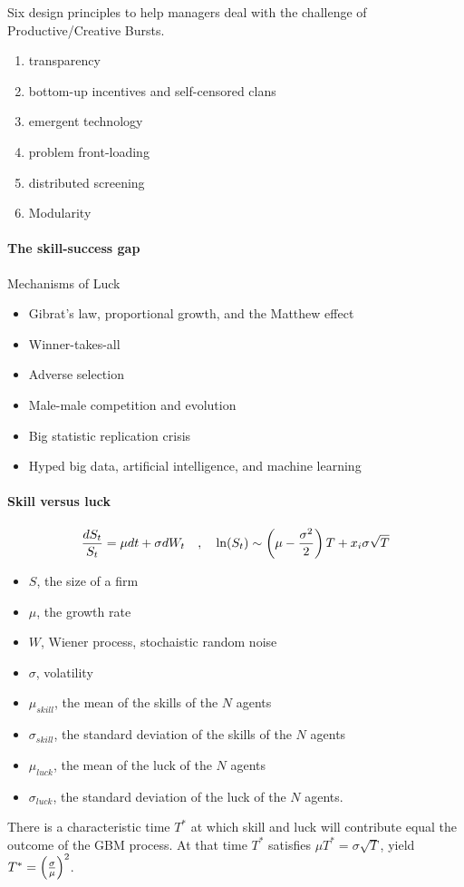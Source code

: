 Six design principles to help managers deal with the challenge of
Productive/Creative Bursts.
\begin{enumerate}[1)]
    \item transparency
    \item bottom-up incentives and self-censored clans
    \item emergent technology
    \item problem front-loading
    \item distributed screening
    \item Modularity
\end{enumerate}

\paragraph{The skill-success gap}

Mechanisms of Luck
\begin{itemize}
    \item Gibrat's law, proportional growth, and the Matthew effect
    \item Winner-takes-all
    \item Adverse selection
    \item Male-male competition and evolution
    \item Big statistic replication crisis
    \item Hyped big data, artificial intelligence, and machine learning
\end{itemize}

\paragraph{Skill versus luck}
\begin{align*}
    \frac{d S_t}{S_t} = \mu dt + \sigma d W_t
    \hspace{10pt} , \hspace{10pt}
    \ln(S_t) \sim \left( \mu - \frac{\sigma^2}{2} \right) T + x_i \sigma \sqrt{T}
\end{align*}
\begin{itemize}
    \item $S$, the size of a firm
    \item $\mu$, the growth rate
    \item $W$, Wiener process, stochaistic random noise
    \item $\sigma$, volatility
    \item $\mu_{skill}$, the mean of the skills of the $N$ agents
    \item $\sigma_{skill}$, the standard deviation of the skills of the $N$ agents
    \item $\mu_{luck}$, the mean of the luck of the $N$ agents
    \item $\sigma_{luck}$, the standard deviation of the luck of the $N$ agents. 
\end{itemize}
There is a characteristic time $T^\ast$ at which skill and luck will contribute
equal the outcome of the GBM process. At that time $T^\ast$ satisfies $\mu T^\ast
= \sigma \sqrt{T}$, yield $T^\ast = \left( \frac{\sigma}{\mu} \right)^2$.

